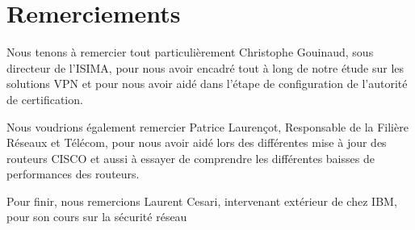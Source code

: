 \section*{Remerciements}

Nous tenons à remercier tout particulièrement Christophe Gouinaud, sous directeur de l'ISIMA, pour nous avoir encadré tout à long de notre étude sur les solutions VPN et pour nous avoir aidé dans l'étape de configuration de l'autorité de certification.

Nous voudrions également remercier Patrice Laurençot, Responsable de la Filière Réseaux et Télécom, pour nous avoir aidé lors des différentes mise à jour des routeurs CISCO et aussi à essayer de comprendre les différentes baisses de performances des routeurs.

Pour finir, nous remercions Laurent Cesari, intervenant extérieur de chez IBM, pour son cours sur la sécurité réseau 


\pagebreak
